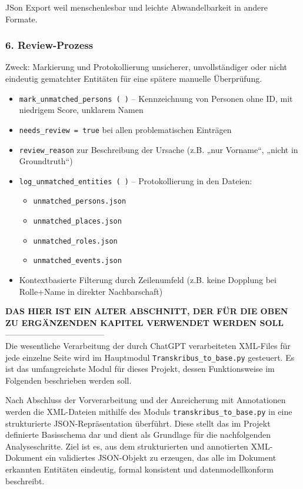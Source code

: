 \documentclass[12pt, a4paper, ngerman, bidi=default]{article}
\newcommand{\code}[1]{\colorbox{VeryLightGray}{\texttt{#1}}} %
\begin{document}
JSon Export weil menschenlesbar und leichte Abwandelbarkeit in andere Formate.

\subsubsection*{6. Review-Prozess}
Zweck: Markierung und Protokollierung unsicherer, unvollständiger oder nicht eindeutig gematchter Entitäten für eine spätere manuelle Überprüfung.

\begin{itemize}
\item \texttt{mark\_unmatched\_persons~(~)} – Kennzeichnung von Personen ohne ID, mit niedrigem Score, unklarem Namen
\item \texttt{needs\_review = true} bei allen problematischen Einträgen
\item \texttt{review\_reason} zur Beschreibung der Ursache (z.B. „nur Vorname“, „nicht in Groundtruth“)
\item \texttt{log\_unmatched\_entities~(~)} – Protokollierung in den Dateien:
  \begin{itemize}
  \item \texttt{unmatched\_persons.json}
  \item \texttt{unmatched\_places.json}
  \item \texttt{unmatched\_roles.json}
  \item \texttt{unmatched\_events.json}
  \end{itemize}
\item Kontextbasierte Filterung durch Zeilenumfeld (z.B. keine Dopplung bei Rolle+Name in direkter Nachbarschaft)
\end{itemize}


\vspace{1em}\textbf{DAS HIER IST EIN ALTER ABSCHNITT, DER FÜR DIE OBEN ZU ERGÄNZENDEN KAPITEL VERWENDET WERDEN SOLL}\\
------------------------------------\\
Die wesentliche Verarbeitung der durch ChatGPT verarbeiteten XML-Files für jede einzelne Seite wird im 
Hauptmodul \code{Transkribus\_to\_base.py} gesteuert. Es ist das umfangreichste
Modul für dieses Projekt, dessen Funktionsweise im Folgenden beschrieben werden soll.

Nach Abschluss der Vorverarbeitung und der Anreicherung mit Annotationen werden die XML-Dateien mithilfe des 
Moduls \texttt{transkribus\_to\_base.py} in eine strukturierte JSON-Repräsentation überführt. Diese stellt das 
im Projekt definierte Basisschema dar und dient als Grundlage für die nachfolgenden Analyseschritte. Ziel ist es, 
aus dem strukturierten und annotierten XML-Dokument ein validiertes JSON-Objekt zu erzeugen, das alle im Dokument 
erkannten Entitäten eindeutig, formal konsistent und datenmodellkonform beschreibt.
\end{document}
